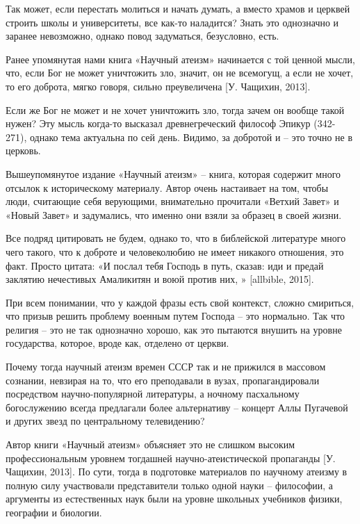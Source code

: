 Так может, если перестать молиться и начать думать, а вместо храмов и церквей строить школы и университеты, все как-то наладится? Знать это однозначно и заранее невозможно, однако повод задуматься, безусловно, есть.

Ранее упомянутая нами книга «Научный атеизм» начинается с той ценной мысли, что, если Бог не может уничтожить зло, значит, он не всемогущ, а если не хочет, то его доброта, мягко говоря, сильно преувеличена [У. Чащихин, 2013].

Если же Бог не может и не хочет уничтожить зло, тогда зачем он вообще такой нужен? Эту мысль когда-то высказал древнегреческий философ Эпикур (342-271), однако тема актуальна по сей день. Видимо, за добротой и  – это точно не в церковь.

Вышеупомянутое издание «Научный атеизм» – книга, которая содержит много отсылок к историческому материалу. Автор очень настаивает на том, чтобы люди, считающие себя верующими, внимательно прочитали «Ветхий Завет» и «Новый Завет» и задумались, что именно они взяли за образец в своей жизни.

Все подряд цитировать не будем, однако то, что в библейской литературе много чего такого, что к доброте и человеколюбию не имеет никакого отношения, это факт. Просто цитата: «И послал тебя Господь в путь, сказав: иди и предай заклятию нечестивых Амаликитян и воюй против них, » [allbible, 2015].

При всем понимании, что у каждой фразы есть свой контекст, сложно смириться, что призыв решить проблему военным путем  Господа – это нормально. Так что религия – это не так однозначно хорошо, как это пытаются внушить на уровне государства, которое, вроде как, отделено от церкви.

Почему тогда научный атеизм времен СССР так и не прижился в массовом сознании, невзирая на то, что его преподавали в вузах, пропагандировали посредством научно-популярной литературы, а ночному пасхальному богослужению всегда предлагали более  альтернативу – концерт Аллы Пугачевой и других звезд  по центральному телевидению?

Автор книги «Научный атеизм» объясняет это не слишком высоким профессиональным уровнем тогдашней научно-атеистической пропаганды [У. Чащихин, 2013]. По сути, тогда в подготовке материалов по научному атеизму в полную силу участвовали представители только одной науки – философии, а аргументы из естественных наук были на уровне школьных учебников физики, географии и биологии.

